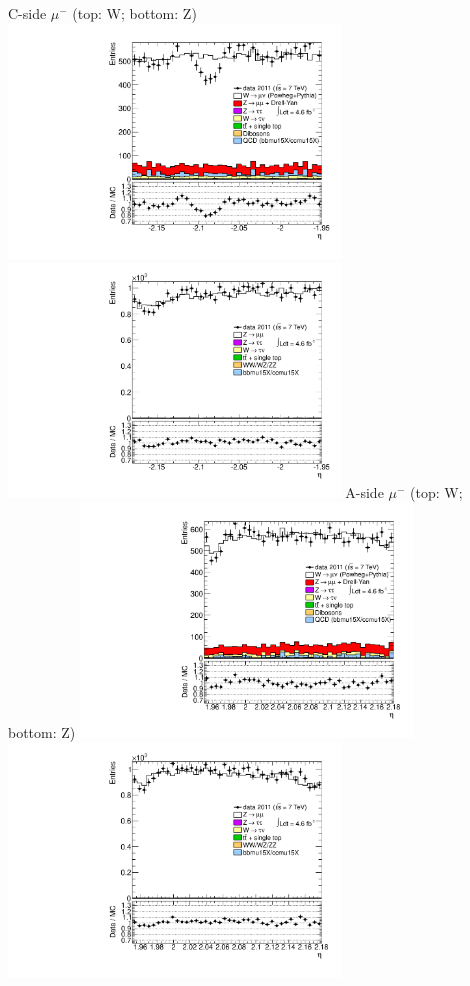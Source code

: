  {
\colb[T]
C-side $\mu^{-}$ (top: W; bottom: Z)
\centering
\includegraphics[width=0.66\textwidth]{dates/20130306/figures/both/WpItoI_10_C_stack_l_eta_NEG} \\
\includegraphics[width=0.66\textwidth]{dates/20130306/figures/both/Z_10_C_stack_lN_eta_ALL.pdf}
A-side $\mu^{-}$ (top: W; bottom: Z)
\centering
\includegraphics[width=0.66\textwidth]{dates/20130306/figures/both/WpItoI_10_A_stack_l_eta_NEG} \\
\includegraphics[width=0.66\textwidth]{dates/20130306/figures/both/Z_10_A_stack_lN_eta_ALL.pdf} 
\cole
}
